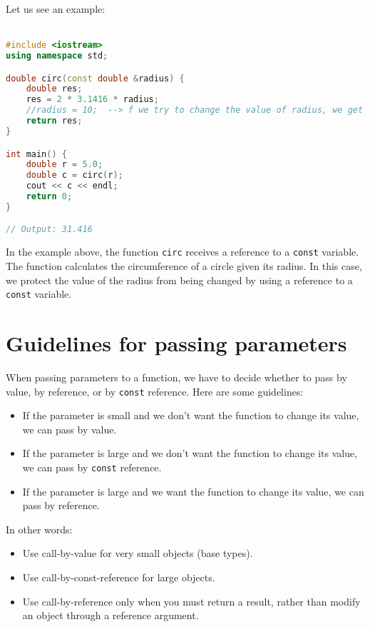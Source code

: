 Let us see an example:\\ \\

\begin{lstlisting}[language=C++]
#include <iostream>
using namespace std;

double circ(const double &radius) {
    double res;
    res = 2 * 3.1416 * radius;
    //radius = 10;  --> f we try to change the value of radius, we get an error 
    return res;
}

int main() {
    double r = 5.0;
    double c = circ(r);
    cout << c << endl;
    return 0;
}

// Output: 31.416
\end{lstlisting}

In the example above, the function \texttt{circ} receives a reference to a
\texttt{const} variable. The function calculates the circumference of a circle
given its radius. In this case, we protect the value of the radius from being
changed by using a reference to a \texttt{const} variable.

\section{Guidelines for passing parameters}

When passing parameters to a function, we have to decide whether to pass by
value, by reference, or by \texttt{const} reference. Here are some guidelines:

\begin{itemize}
    \item If the parameter is small and we don't want the function to change its
    value, we can pass by value.
    \item If the parameter is large and we don't want the function to change its
    value, we can pass by \texttt{const} reference.
    \item If the parameter is large and we want the function to change its value,
    we can pass by reference.
\end{itemize}

In other words:

\begin{itemize}
    \item Use call-by-value for very small objects (base types).
    \item Use call-by-const-reference for large objects.
    \item Use call-by-reference only when you must return a result,
    rather than modify an object through a reference argument.
\end{itemize}


